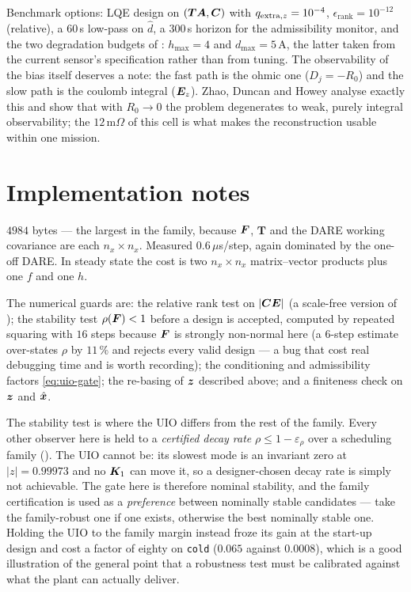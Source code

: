 Benchmark options: LQE design on $(\bm{T}\bm{A},\bm{C})$ with $q_{\text{extra},z}=10^{-4}$,
$\epsilon_{\mathrm{rank}}=10^{-12}$ (relative), a $60$\,s low-pass on $\hat{d}$, a $300$\,s
horizon for the admissibility monitor, and the two degradation budgets of
: $h_{\max}=4$ and $d_{\max}=5$\,A, the latter taken from the current
sensor's specification rather than from tuning.  The
observability of the bias itself deserves a note: the fast path is the ohmic one ($D_j=-R_0$) and
the slow path is the coulomb integral ($\bm{E}_{z}$).  Zhao, Duncan and Howey
\cite{zhao2017observability} analyse exactly this and show that with $R_0\to0$ the problem
degenerates to weak, purely integral observability; the $12$\,m$\Omega$ of this cell is what makes
the reconstruction usable within one mission.

\section{Implementation notes}
$4984$ bytes --- the largest in the family, because $\bm{F}$, $\bm{T}$ and the DARE working covariance
are each $n_x\times n_x$.  Measured $0.6\,\mu$s/step, again dominated by the one-off DARE.  In
steady state the cost is two $n_x\times n_x$ matrix--vector products plus one $f$ and one $h$.

The numerical guards are: the relative rank test on $|\bm{C}\bm{E}|$ (a scale-free version of
); the stability test $\rho(\bm{F})<1$ before a design is accepted, computed by
repeated squaring with $16$ steps because $\bm{F}$ is strongly non-normal here (a $6$-step estimate
over-states $\rho$ by $11\,\%$ and rejects every valid design --- a bug that cost real debugging
time and is worth recording); the conditioning and admissibility factors \eqref{eq:uio-gate}; the
re-basing of $\bm{z}$ described above; and a finiteness check on $\bm{z}$ and $\hat{\bm{x}}$.

The stability test is where the UIO differs from the rest of the family.  Every other observer
here is held to a \emph{certified decay rate} $\rho \le 1-\varepsilon_\rho$ over a scheduling
family ().  The UIO cannot be: its slowest mode is an invariant zero at
$|z|=0.99973$ and no $\bm{K}_1$ can move it, so a designer-chosen decay rate is simply not
achievable.  The gate here is therefore nominal stability, and the family certification is used as
a \emph{preference} between nominally stable candidates --- take the family-robust one if one
exists, otherwise the best nominally stable one.  Holding the UIO to the family margin instead
froze its gain at the start-up design and cost a factor of eighty on \texttt{cold}
($0.065$ against $0.0008$), which is a good illustration of the general point that a robustness
test must be calibrated against what the plant can actually deliver.

